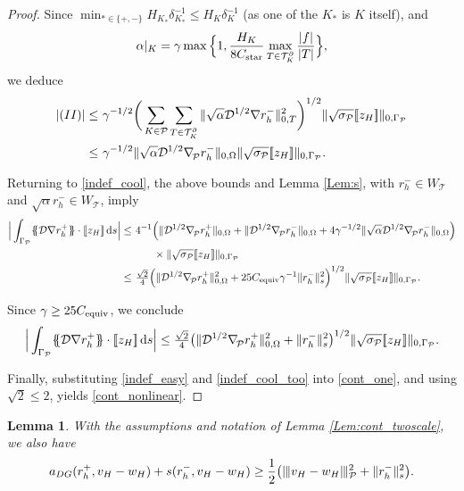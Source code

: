 \documentclass[11pt,final]{amsart}
\theoremstyle{plain}
\newtheorem{lemma}[theorem]{Lemma}
\theoremstyle{definition}
\newcommand\calP{{\mathcal{P}}}
\newcommand\calT{{\mathcal{T}}}
\newcommand{\mesh}{\calP}
\newcommand{\mean}[1]{\{\kern-1.1mm\{#1\}\kern-1.1mm\}}
\newcommand{\jump}[1]{[\![#1]\!]}                        %
\newcommand{\ud}{\,\mathrm{d}}
\newcommand{\ndgp}[1]{| \kern -.25mm \|{#1}| \kern -.25mm \|_{\rm \mesh}}
\newcommand{\norm}[2]{\|{#1}\|_{{#2}}}
\renewcommand{\k}{K}
\newcommand{\bnabla}{\nabla_{\kern-.05cm\mesh}^{}}
\begin{document}
\begin{proof}
Since $\min_{*\in\{+,-\}}H_{\k_*}\delta_{\k_*}^{-1}\le H_\k\delta_{\k}^{-1}$ (as one of the $\k_*$ is $\k$ itself), and
\[
\alpha|_\k= \gamma \max\Big\{1,\frac{ H_{\k}}{8C_{\rm star}}\max_{T\in\calT_\k^\partial}\frac{|f|}{|T|}\Big\},
\]
we deduce
\begin{align}\label{cool_minus}
|(II)|
\le&\ \gamma^{-1/2}\bigg(\sum_{\k\in\mesh}\sum_{T\in \mathcal{T}_\k^\partial}
\norm{\sqrt{\alpha}\mathcal{D}^{1/2}\nabla r_h^-}{0,T}^2\bigg)^{1/2}
\norm{\sqrt{\sigma_\calP}\jump{z_H}}{0,\Gamma_{\calP}}\\
\le&\
\gamma^{-1/2}\norm{\sqrt{\alpha}\mathcal{D}^{1/2}\bnabla r_h^-}{0,\Omega}
\norm{\sqrt{\sigma_\calP}\jump{z_H}}{0,\Gamma_{\calP}}.\nonumber
\end{align}

Returning to \eqref{indef_cool}, the above bounds and Lemma
\ref{Lem:s}, with $r_h^-\in W_\calT$ and $\sqrt{\alpha}r_h^-\in
W_\calT$, imply
\[
\begin{aligned}
\Big|	\int_{\Gamma_{\calP}}\mean{\mathcal{D}\nabla r_h^+}\cdot\jump{z_H}\ud s\Big|
\le&\  4^{-1}\Big(\norm{\mathcal{D}^{1/2}\bnabla r_h^+}{0,\Omega}
+\norm{\mathcal{D}^{1/2}\bnabla r_h^-}{0,\Omega}
+4\gamma^{-1/2}\norm{\sqrt{\alpha}\mathcal{D}^{1/2}\bnabla r_h^-}{0,\Omega}\Big)
\\
&
\qquad \times\norm{\sqrt{\sigma_\calP}\jump{z_H}}{0,\Gamma_{\calP}}\\
\le&\  \tfrac{\sqrt{2}}{4}\Big(\norm{ \mathcal{D}^{1/2}\bnabla r_h^+}{0,\Omega}^2
+ 25 C_{\rm equiv}\gamma^{-1}\norm{ r_h^-}{s}^2\Big)^{1/2}
\norm{\sqrt{\sigma_\calP}\jump{z_H}}{0,\Gamma_{\calP}}.
\end{aligned}
\]

Since $\gamma\ge 25C_{\rm equiv}$, we conclude
\begin{equation}\label{indef_cool_too}
\Big|\int_{\Gamma_{\calP}}\mean{\mathcal{D}\nabla r_h^+}\cdot\jump{z_H}\ud s\Big|
\le 
\tfrac{\sqrt{2}}{4}\big(\norm{\mathcal{D}^{1/2}\bnabla r_h^+}{0,\Omega}^2
+\norm{r_h^-}{s}^2\big)^{1/2}
\norm{\sqrt{\sigma_\calP}\jump{z_H}}{0,\Gamma_{\calP}}.
\end{equation}

Finally, substituting \eqref{indef_easy} and \eqref{indef_cool_too}
into \eqref{cont_one}, and using $\sqrt{2}\le 2$, yields
\eqref{cont_nonlinear}.
\end{proof}

\begin{lemma}\label{Lem:mon_twoscale}
With the assumptions and notation of Lemma \ref{Lem:cont_twoscale}, we also have
\begin{equation}\label{mon_dec_lemma}
\begin{aligned}
a_{DG}(r_h^+,v_H-w_H)+s(r_h^-,v_H-w_H) 
 \ge  \frac{1}{2}\big(\ndgp{v_H-w_H}^2+\|r_h^-\|_{s}^2\big).
\end{aligned}
\end{equation}
\end{lemma}
\end{document}
